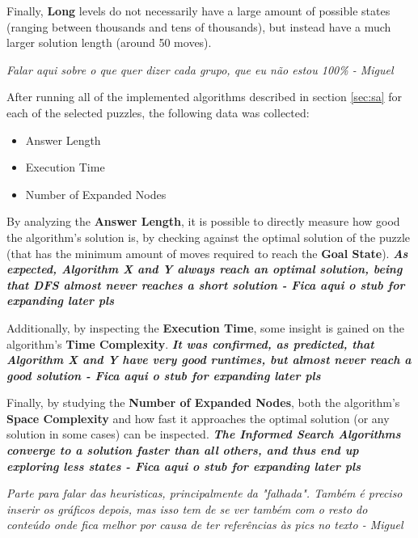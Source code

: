 \documentclass[conference]{IEEEtran}
\begin{document}
Finally, \textbf{Long} levels do not necessarily have a large amount of possible states (ranging between thousands and tens of thousands), but instead have a much larger solution length (around 50 moves).

\begin{bf}
\textit{
Falar aqui sobre o que quer dizer cada grupo, que eu não estou 100\% - Miguel
}
\end{bf}

After running all of the implemented algorithms described in section \autoref{sec:sa} for each of the selected puzzles, the following data was collected:

\begin{itemize}
    \item Answer Length
    \item Execution Time
    \item Number of Expanded Nodes
\end{itemize}

By analyzing the \textbf{Answer Length}, it is possible to directly measure how good the algorithm's solution is, by checking against the optimal solution of the puzzle (that has the minimum amount of moves required to reach the \textbf{Goal State}). \textbf{\textit{As expected, Algorithm X and Y always reach an optimal solution, being that DFS almost never reaches a short solution - Fica aqui o stub for expanding later pls}}

Additionally, by inspecting the \textbf{Execution Time}, some insight is gained on the algorithm's \textbf{Time Complexity}. \textbf{\textit{It was confirmed, as predicted, that Algorithm X and Y have very good runtimes, but almost never reach a good solution - Fica aqui o stub for expanding later pls}}

Finally, by studying the \textbf{Number of Expanded Nodes}, both the algorithm's \textbf{Space Complexity} and how fast it approaches the optimal solution (or any solution in some cases) can be inspected. \textbf{\textit{The \textbf{Informed Search Algorithms} converge to a solution faster than all others, and thus end up exploring less states - Fica aqui o stub for expanding later pls}}

\begin{bf}
\textit{
Parte para falar das heuristicas, principalmente da "falhada". Tamb\'em \'e preciso inserir os gr\'aficos depois, mas isso tem de se ver tamb\'em com o resto do conte\'udo onde fica melhor por causa de ter referências às pics no texto - Miguel
}
\end{bf}
\end{document}
